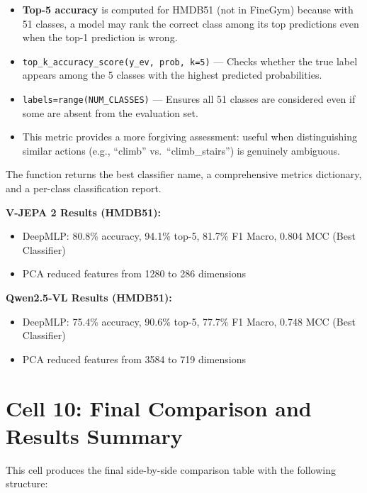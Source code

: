 \begin{explanation}
\begin{itemize}[nosep]
  \item \textbf{Top-5 accuracy} is computed for HMDB51 (not in FineGym) because with 51 classes, a model may rank the correct class among its top predictions even when the top-1 prediction is wrong.
  \item \texttt{top\_k\_accuracy\_score(y\_ev, prob, k=5)} --- Checks whether the true label appears among the 5 classes with the highest predicted probabilities.
  \item \texttt{labels=range(NUM\_CLASSES)} --- Ensures all 51 classes are considered even if some are absent from the evaluation set.
  \item This metric provides a more forgiving assessment: useful when distinguishing similar actions (e.g., ``climb'' vs.\ ``climb\_stairs'') is genuinely ambiguous.
\end{itemize}
\end{explanation}

The function returns the best classifier name, a comprehensive metrics dictionary, and a per-class classification report.

\textbf{V-JEPA 2 Results (HMDB51):}
\begin{itemize}[nosep]
  \item DeepMLP: 80.8\% accuracy, 94.1\% top-5, 81.7\% F1 Macro, 0.804 MCC (Best Classifier)
  \item PCA reduced features from 1280 to 286 dimensions
\end{itemize}

\textbf{Qwen2.5-VL Results (HMDB51):}
\begin{itemize}[nosep]
  \item DeepMLP: 75.4\% accuracy, 90.6\% top-5, 77.7\% F1 Macro, 0.748 MCC (Best Classifier)
  \item PCA reduced features from 3584 to 719 dimensions
\end{itemize}

\newpage
\section{Cell 10: Final Comparison and Results Summary}

This cell produces the final side-by-side comparison table with the following structure:

